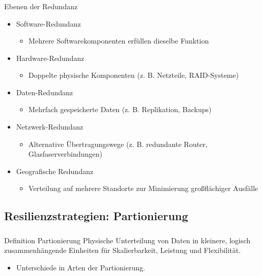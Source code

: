 \begin{frame}
    \frametitle{\insertsection}
    \framesubtitle{\insertsubsection}

    \begin{block}{Ebenen der Redundanz}
        \begin{itemize}
            \item Software-Redundanz
            \begin{itemize}
                \item Mehrere Softwarekomponenten erfüllen dieselbe Funktion
            \end{itemize}
            \item Hardware-Redundanz
            \begin{itemize}
                \item Doppelte physische Komponenten (z. B. Netzteile, RAID-Systeme)
            \end{itemize}
            \item Daten-Redundanz
            \begin{itemize}
                \item Mehrfach gespeicherte Daten (z. B. Replikation, Backups)
            \end{itemize}
            \item Netzwerk-Redundanz
            \begin{itemize}
                \item Alternative Übertragungswege (z. B. redundante Router, Glasfaserverbindungen)
            \end{itemize}
            \item Geografische Redundanz
            \begin{itemize}
                \item Verteilung auf mehrere Standorte zur Minimierung großflächiger Ausfälle
            \end{itemize}
        \end{itemize}
    \end{block}
\end{frame}

\subsection{Resilienzstrategien: Partionierung}
\begin{frame}
    \frametitle{\insertsection}
    \framesubtitle{\insertsubsection}

    \begin{block}{Definition Partionierung}
        Physische Unterteilung von Daten in kleinere, logisch zusammenhängende Einheiten für Skalierbarkeit, Leistung und Flexibilität.\\
        \begin{itemize}
            \item Unterschiede in Arten der Partionierung.
        \end{itemize}
    \end{block}
\end{frame}


